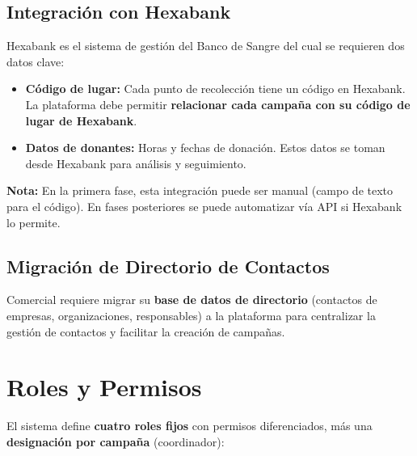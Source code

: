 \documentclass[10pt,a4paper]{article}
\begin{document}
\subsection{Integraci\'{o}n con Hexabank}

Hexabank es el sistema de gesti\'{o}n del Banco de Sangre del cual se requieren dos datos clave:

\begin{itemize}[leftmargin=2em]
    \item \textbf{C\'{o}digo de lugar:} Cada punto de recolecci\'{o}n tiene un c\'{o}digo en Hexabank. La plataforma debe permitir \textbf{relacionar cada campaña con su c\'{o}digo de lugar de Hexabank}.
    \item \textbf{Datos de donantes:} Horas y fechas de donaci\'{o}n. Estos datos se toman desde Hexabank para an\'{a}lisis y seguimiento.
\end{itemize}

\textbf{Nota:} En la primera fase, esta integraci\'{o}n puede ser manual (campo de texto para el c\'{o}digo). En fases posteriores se puede automatizar v\'{i}a API si Hexabank lo permite.

\subsection{Migraci\'{o}n de Directorio de Contactos}

Comercial requiere migrar su \textbf{base de datos de directorio} (contactos de empresas, organizaciones, responsables) a la plataforma para centralizar la gesti\'{o}n de contactos y facilitar la creaci\'{o}n de campañas.

\section{Roles y Permisos}

El sistema define \textbf{cuatro roles fijos} con permisos diferenciados, m\'{a}s una \textbf{designaci\'{o}n por campaña} (coordinador):
\end{document}
